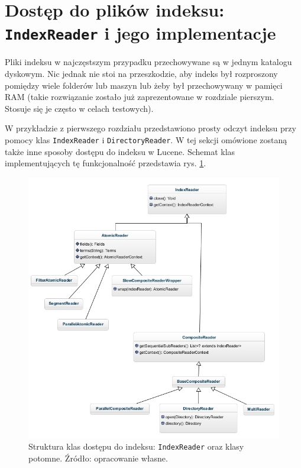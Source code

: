 \section{Dostęp do plików indeksu: \texttt{IndexReader} i jego implementacje}
\label{sec:indexReader}

Pliki indeksu w najczęstszym przypadku przechowywane są w jednym katalogu dyskowym. Nic jednak nie stoi na przeszkodzie, aby indeks był rozproszony pomiędzy wiele folderów lub maszyn lub żeby był przechowywany w pamięci RAM (takie rozwiązanie zostało już zaprezentowane w rozdziale pierszym. Stosuje się je często w celach testowych).

W przykładzie z pierwszego rozdziału przedstawiono prosty odczyt indeksu przy pomocy klas \texttt{IndexReader} i \texttt{DirectoryReader}. W tej sekcji omówione zostaną także inne sposoby dostępu do indeksu w Lucene. Schemat klas implementujących tę funkcjonalność przedstawia rys. \ref{fig:indexReader}. 

\begin{figure}[p]
 \centering
 \includegraphics[scale=0.64]{pictures/Readers_1.jpg}
 \caption{Struktura klas dostępu do indeksu: \texttt{IndexReader} oraz klasy potomne. Źródło: opracowanie własne. \label{fig:indexReader}}
\end{figure}

